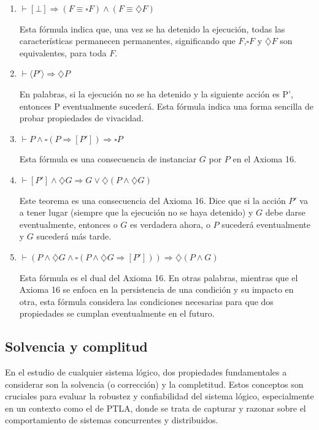 \begin{enumerate}
    \item $\vdash [\bot] \Rightarrow (F \equiv \square F) \land (F \equiv \diamondsuit F)$

    Esta fórmula indica que, una vez se ha detenido la ejecución, todas las características permanecen permanentes, significando que $F$,$\square F$ y $\diamondsuit F$ son equivalentes, para toda $F$.
    
    \item $\vdash \langle P' \rangle \Rightarrow \diamondsuit P$

    En palabras, si la ejecución no se ha detenido y la siguiente acción es P', entonces P eventualmente sucederá. Esta fórmula indica una forma sencilla de probar propiedades de vivacidad.

    
    \item $\vdash P \land \square(P \Rightarrow [P']) \Rightarrow \square P$

    Esta fórmula es una consecuencia de instanciar $G$ por $P$ en el Axioma 16.
    
    \item $\vdash [P'] \land \diamondsuit G \Rightarrow G \lor \diamondsuit (P \land \diamondsuit G)$

    Este teorema es una consecuencia del Axioma 16. Dice que si la acción $P'$ va a tener lugar (siempre que la ejecución no se haya detenido) y $G$ debe darse eventualmente, entonces o $G$ es verdadera ahora, o $P$ sucederá eventualmente y $G$ sucederá más tarde.
    
    \item $\vdash (P \land \diamondsuit G \land \square (P \land \diamondsuit G \Rightarrow [P'])) \Rightarrow \diamondsuit (P \land G)$

    Esta fórmula es el dual del Axioma 16. En otras palabras, mientras que el Axioma 16 se enfoca en la persistencia de una condición y su impacto en otra, esta fórmula considera las condiciones necesarias para que dos propiedades se cumplan eventualmente en el futuro.
\end{enumerate}

\subsection{Solvencia y complitud}\label{subsection:TLAcompleteness}
En el estudio de cualquier sistema lógico, dos propiedades fundamentales a considerar son la solvencia (o corrección) y la completitud. Estos conceptos son cruciales para evaluar la robustez y confiabilidad del sistema lógico, especialmente en un contexto como el de PTLA, donde se trata de capturar y razonar sobre el comportamiento de sistemas concurrentes y distribuidos.

